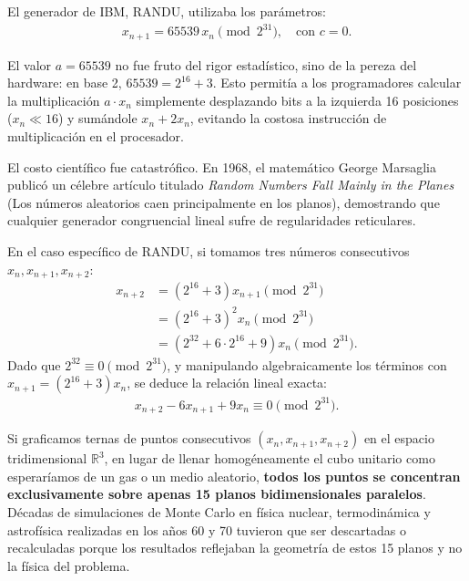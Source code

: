 \documentclass[12pt]{article}
\begin{document}
\begin{cajaflex}
El generador de IBM, RANDU, utilizaba los parámetros:
\begin{align*}
    x_{n+1} = 65539 \, x_n \pmod{2^{31}}, \quad \text{con } c = 0.
\end{align*}

El valor $a = 65539$ no fue fruto del rigor estadístico, sino de la pereza del hardware: en base 2, $65539 = 2^{16} + 3$. Esto permitía a los programadores calcular la multiplicación $a \cdot x_n$ simplemente desplazando bits a la izquierda 16 posiciones ($x_n \ll 16$) y sumándole $x_n + 2x_n$, evitando la costosa instrucción de multiplicación en el procesador.

El costo científico fue catastrófico. En 1968, el matemático George Marsaglia publicó un célebre artículo titulado \textit{Random Numbers Fall Mainly in the Planes} (Los números aleatorios caen principalmente en los planos), demostrando que cualquier generador congruencial lineal sufre de regularidades reticulares. 

En el caso específico de RANDU, si tomamos tres números consecutivos $x_n, x_{n+1}, x_{n+2}$:
\begin{align*}
    x_{n+2} &= (2^{16} + 3) x_{n+1} \pmod{2^{31}} \\
            &= (2^{16} + 3)^2 x_n \pmod{2^{31}} \\
            &= (2^{32} + 6 \cdot 2^{16} + 9) x_n \pmod{2^{31}}.
\end{align*}
Dado que $2^{32} \equiv 0 \pmod{2^{31}}$, y manipulando algebraicamente los términos con $x_{n+1} = (2^{16} + 3) x_n$, se deduce la relación lineal exacta:
\begin{align*}
    x_{n+2} - 6 x_{n+1} + 9 x_n \equiv 0 \pmod{2^{31}}.
\end{align*}

Si graficamos ternas de puntos consecutivos $(x_n, x_{n+1}, x_{n+2})$ en el 
espacio tridimensional $\mathbb{R}^3$, en lugar de llenar homogéneamente el cubo 
unitario como esperaríamos de un gas o un medio aleatorio, 
\textbf{todos los puntos se concentran exclusivamente sobre apenas 15 planos 
bidimensionales paralelos}.
Décadas de simulaciones de Monte Carlo en física nuclear, termodinámica y 
astrofísica realizadas en los años 60 y 70 tuvieron que ser descartadas o 
recalculadas porque los resultados reflejaban la geometría de estos 15 
planos y no la física del problema.
\end{cajaflex}
\end{document}
